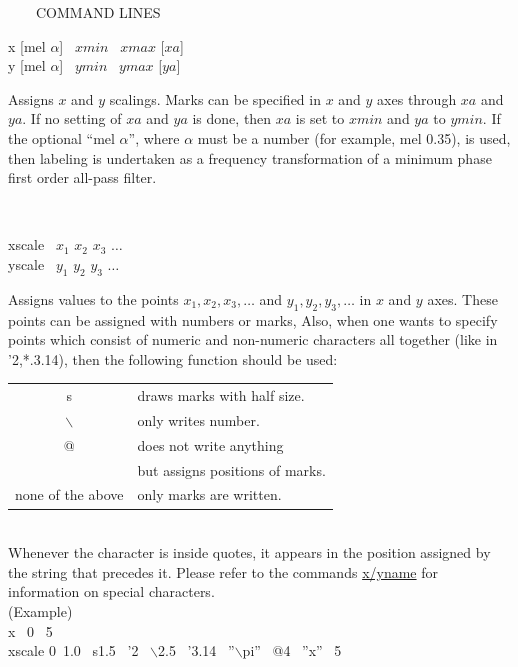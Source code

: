 \vspace{-1cm}
\begin{qsection}{\ ~~~COMMAND LINES}
\begin{minipage}[t]{5.5cm}
x [mel $\alpha$]~ $xmin$ ~$xmax$ [$xa$]\\
y [mel $\alpha$]~ $ymin$ ~$ymax$ [$ya$]\\
\end{minipage}
\begin{minipage}[t]{9cm}
Assigns $x$ and $y$ scalings.
Marks can be specified in $x$ and $y$ axes through $xa$ and $ya$.
If no setting of $xa$ and $ya$ is done,
then $xa$ is set to $xmin$ and $ya$ to $ymin$.
If the optional ``mel $\alpha$'', where $\alpha$ must be
a number (for example, mel 0.35), is used,
then labeling is undertaken as a frequency transformation of
a minimum phase first order all-pass filter.
\end{minipage} \\

\begin{minipage}[t]{5.5cm}
xscale ~$x_1$ $x_2$ $x_3$ $\dots$\\
yscale ~$y_1$ $y_2$ $y_3$ $\dots$
\end{minipage}
\begin{minipage}[t]{9cm}
Assigns values to the points $x_1, x_2,x_3,\dots$
and $y_1,y_2,y_3,\dots$ in $x$ and $y$ axes.
These points can be assigned with numbers or marks,
Also, when one wants to specify points which consist of numeric and non-numeric
characters all together (like in '2,*.3.14), then the following function should
be used:
\begin{tabular}{cl}
s & draws marks with half size.\\
$\backslash$& only writes number.\\
@ & does not write anything \\
  & but assigns positions of marks.\\
none of the above & only marks are written.
\end{tabular}\\

Whenever the character is inside quotes,
it appears in the position assigned
by the string that precedes it.
Please refer to the commands \hyperlink{xyname}{x/yname} for information on
special characters.\\
(Example)\\
x ~0 ~5\\
xscale 0~1.0 ~s1.5 ~'2 ~$\backslash$2.5 ~'3.14 ~''$\backslash$pi'' ~@4 ~''x'' ~5\\


\end{minipage}
\end{qsection}
